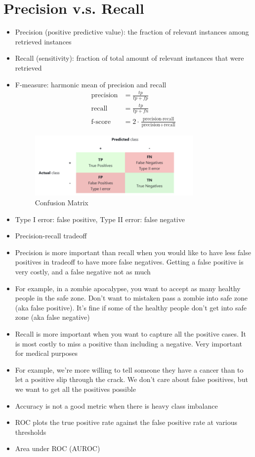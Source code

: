 \documentclass[../main.tex]{subfiles}
\begin{document}
\section{Precision v.s. Recall}
  \begin{itemize}
    \item Precision (positive predictive value): the fraction of relevant instances among retrieved instances
    \item Recall (sensitivity): fraction of total amount of relevant instances that were retrieved
    \item F-measure: harmonic mean of precision and recall
    \begin{align*}
      \text{precision} &= \frac{tp}{tp+fp} \\
      \text{recall} &= \frac{tp}{tp+fn} \\
      \text{f-score} &= 2 \cdot \frac{\text{precision} \cdot \text{recall}}{\text{precision} + \text{recall}}
    \end{align*}
    \begin{figure}[h]
      \caption{Confusion Matrix}
      \centering
      \includegraphics[width=0.8\textwidth]{../imgs/confusion_matrix.png}
    \end{figure}
    \item Type I error: false positive, Type II error: false negative
    \item Precision-recall tradeoff
    \item Precision is more important than recall when you would like to have less false positives in tradeoff to have more false negatives. Getting a false positive is very costly, and a false negative not as much
    \item For example, in a zombie apocalypse, you want to accept as many healthy people in the safe zone. Don't want to mistaken pass a zombie into safe zone (aka false positive). It's fine if some of the healthy people don't get into safe zone (aka false negative)
    \item Recall is more important when you want to capture all the positive cases. It is most costly to miss a positive than including a negative. Very important for medical purposes
    \item For example, we're more willing to tell someone they have a cancer than to let a positive slip through the crack. We don't care about false positives, but we want to get all the positives possible
    \item Accuracy is not a good metric when there is heavy class imbalance
    \item ROC plots the true positive rate against the false positive rate at various thresholds
    \item Area under ROC (AUROC)
  \end{itemize}
\end{document}
